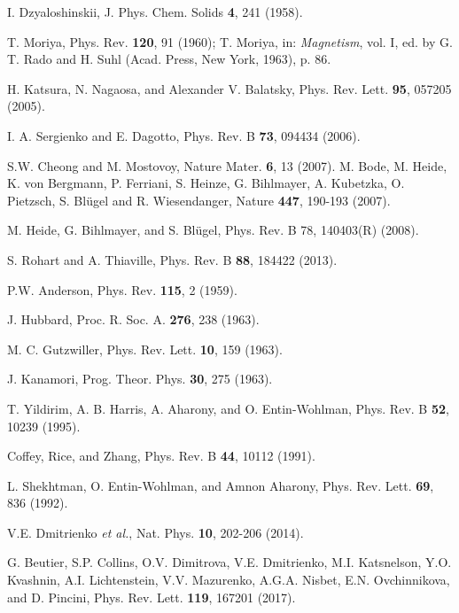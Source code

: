 \documentclass[aps,prl,twocolumn,showpacs,amsmath,amssymb]{revtex4-1}
\begin{document}
\begin{thebibliography}{199}

 I. Dzyaloshinskii,
J. Phys. Chem. Solids {\bf 4}, 241 (1958).

 T. Moriya,
Phys. Rev. {\bf 120}, 91 (1960); T. Moriya, in: {\it Magnetism},
vol. I, ed. by G. T. Rado and H. Suhl (Acad. Press, New York,
1963), p. 86.

 H. Katsura, N. Nagaosa, and Alexander V. Balatsky, Phys. Rev. Lett. {\bf 95}, 057205 (2005).

 I. A. Sergienko and E. Dagotto, Phys. Rev. B {\bf 73}, 094434 (2006).

 S.W. Cheong and M. Mostovoy, Nature Mater. {\bf 6}, 13 (2007).
 M. Bode, M. Heide, K. von Bergmann, P. Ferriani, S. Heinze, G. Bihlmayer, A. Kubetzka, O. Pietzsch, S. Bl{\"u}gel and R. Wiesendanger, Nature {\bf 447}, 190-193 (2007).

 M. Heide, G. Bihlmayer, and S. Bl{\"u}gel, Phys. Rev. B 78, 140403(R) (2008).

 S. Rohart and A. Thiaville, Phys. Rev. B {\bf 88}, 184422 (2013).

 P.W. Anderson,
Phys. Rev. {\bf 115}, 2 (1959).

J. Hubbard, Proc. R. Soc. A. {\bf 276}, 238 (1963).    

M. C. Gutzwiller, Phys. Rev. Lett. {\bf 10}, 159 (1963).

J. Kanamori, Prog. Theor. Phys. {\bf 30}, 275 (1963).

 T. Yildirim, A. B. Harris, A. Aharony,
and O. Entin-Wohlman, Phys. Rev. B {\bf 52}, 10239 (1995).

Coffey, Rice, and Zhang, Phys. Rev. B {\bf 44},
10112 (1991).

L. Shekhtman, O. Entin-Wohlman, and Amnon Aharony, Phys. Rev. Lett. {\bf 69}, 836 (1992).

V.E. Dmitrienko \textit{et al.}, Nat. Phys. {\bf 10}, 202-206 (2014).

G. Beutier, S.P. Collins, O.V. Dimitrova, V.E. Dmitrienko, M.I. Katsnelson, Y.O. Kvashnin, A.I. Lichtenstein, V.V. Mazurenko, A.G.A. Nisbet, E.N. Ovchinnikova, and D. Pincini, Phys. Rev. Lett. {\bf 119}, 167201 (2017).


\end{thebibliography}
\end{document}

